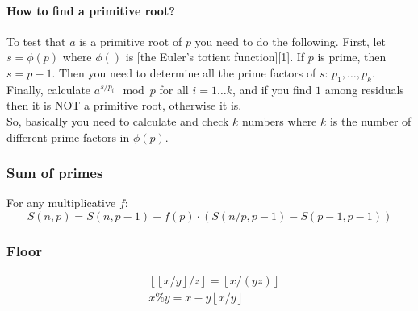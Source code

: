 \documentclass[15pt,a4paper]{article}
\begin{document}
\begin{landscape}
\begin{multicols*}{3}
\paragraph{How to find a primitive root?}
To test that $a$ is a primitive root of $p$ you need to do the following. First, let $s=\phi(p)$ where $\phi()$ is [the Euler's totient function][1]. If $p$ is prime, then $s=p-1$. Then you need to determine all the prime factors of $s$: $p_1,\ldots,p_k$. Finally, calculate $a^{s/p_i}\mod p$ for all $i=1\ldots k$, and if you find $1$ among residuals then it is NOT a primitive root, otherwise it is.\\
So, basically you need to calculate and check $k$ numbers where $k$ is the number of different prime factors in $\phi(p)$.
\subsubsection{Sum of primes} For any multiplicative $f$:
\[
S(n,p) = S(n, p-1) - f(p) \cdot (S(n/p,p-1) - S(p-1,p-1))
\]

\subsubsection{Floor}
\begin{align*}
&\left\lfloor \left\lfloor x/y \right\rfloor / z \right\rfloor = \left\lfloor x / (yz) \right\rfloor \\
&x \% y = x - y \left\lfloor x / y \right\rfloor
\end{align*}

\clearpage
\end{multicols*}
\endgroup
\end{landscape}
\end{document}

